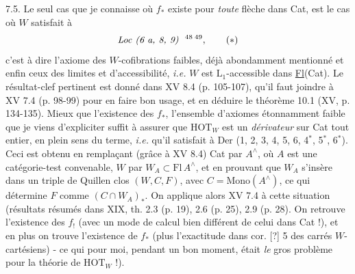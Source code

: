 \documentclass[11pt]{article}
\newcommand{\printedpage}[1]{\marginpar{\footnotesize p.~#1}}
\newcommand{\msp}[1]{\marginpar{\footnotesize [#1]}}
\begin{document}
7.5. Le seul cas que je connaisse où $f_*$ existe pour \textit{toute} flèche dans Cat, est le cas où $W$ satisfait à
\[
\textit{Loc (6 a, 8, 9)}\ \ \text{\footnotemark[48]\,\footnotemark[49]}, \tag*{$(*)$} %
\]
c'est à dire l'axiome des $W$-cofibrations faibles, déjà abondamment mentionné et enfin ceux des limites et d'accessibilité, \textit{i.e.} $W$ est $\mathrm{L}_1$-accessible dans \underline{Fl}(Cat). Le résultat-clef pertinent est donné dans XV 8.4 (p. 105-107), qu'il faut joindre à XV 7.4 (p. 98-99) pour en faire
\msp{page 104}
bon usage, et en déduire le théorème 10.1 (XV, p. 134-135). Mieux que l'existence des $f_*$, l'ensemble d'axiomes étonnamment faible que je viens d'expliciter suffit à assurer que $\mathrm{HOT}_W$ est un \textit{dérivateur} sur Cat tout entier, en plein sens du terme, \textit{i.e.} qu'il satisfait à Der (1, 2, 3, 4, 5, 6, 4$^*$, 5$^*$, 6$^*$). Ceci est obtenu en remplaçant (grâce à XV 8.4) Cat par
\printedpage{51}
$A^\wedge$, où $A$ est une catégorie-test convenable, $W$ par $W_A \subset \mathrm{Fl}\, A^\wedge$, et en prouvant que $W_A$ s'insère dans un triple de Quillen clos $(W,C,F)$, avec $C = \mathrm{Mono}(A^\wedge)$, ce qui détermine $F$ comme $(C \cap W_A)_*$. On applique alors XV 7.4 à cette situation (résultats résumés dans XIX, th. 2.3 (p. 19), 2.6 (p. 25), 2.9 (p. 28). On retrouve l'existence des $f_!$ (avec un mode de calcul bien différent de celui dans Cat !), et en plus on trouve l'existence de $f_*$ (plus l'exactitude dans cor. [?] 5
\msp{page 105}
des carrés $W$-cartésiens) - ce qui pour moi, pendant un bon moment, était \textit{le} gros problème pour la théorie de $\mathrm{HOT}_W$ !).
\end{document}
